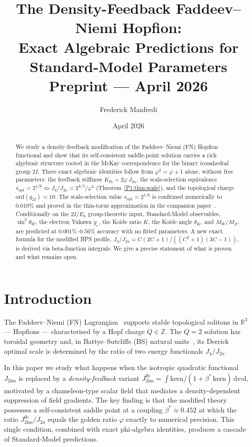 \documentclass[11pt,a4paper]{article}
\title{\textbf{The Density-Feedback Faddeev--Niemi Hopfion:\\
Exact Algebraic Predictions for Standard-Model Parameters}
\\[0.6em]
\large Preprint --- April 2026}
\author{Frederick Manfredi}
\date{April 2026}
\theoremstyle{definition}
\theoremstyle{remark}
\newcommand{\vp}{\varphi}
\newcommand{\bst}{\beta^{*}}
\newcommand{\Kfb}{K_{\mathrm{fb}}}
\newcommand{\Jfb}{J_{2\mathrm{iso}}^{\mathrm{fb}}}
\newcommand{\Ja}{J_{2a}}
\newcommand{\Jiso}{J_{2\mathrm{iso}}}
\newcommand{\Jfour}{J_{4}}
\newcommand{\sopt}{s_{\mathrm{opt}}}
\newcommand{\sinW}{\sin^{2}\!\theta_{W}}
\begin{document}
\maketitle

\begin{abstract}
We study a density-feedback modification of the Faddeev--Niemi (FN)
Hopfion functional and show that its self-consistent saddle-point solution
carries a rich algebraic structure rooted in the McKay correspondence for
the binary icosahedral group $2I$.  Three exact algebraic identities follow
from $\vp^{2}=\vp+1$ alone, without free parameters: the feedback stiffness
$\Kfb = 2\vp\,\Ja$, the scale-selection equivalence
$\sopt = 2^{1/6} \Leftrightarrow \Jfour/\Ja = 2^{4/3}/\vp^{5}$
(Theorem~\ref{P1:thm:scale}), and the topological charge
$\mathrm{ord}(q_{2I}) = 10$.  The scale-selection value $\sopt=2^{1/6}$
is confirmed numerically to $0.010\%$ and proved in the thin-torus
approximation in the companion paper~\cite{Paper2}.
Conditionally on the $2I/E_8$ group-theoretic
input, Standard-Model observables,  $\sinW$, the electron
Yukawa $y_e$, the Koide ratio $K$, the Koide angle $\theta_K$, and
$M_W/M_Z$,  are predicted at $0.001\%$--$0.56\%$ accuracy with no
fitted parameters.  A new exact formula for the modified BPS profile,
$\Jfour/\Ja = C(2C+1)/((C^{2}+1)(3C-1))$, is derived via beta-function
integrals.  We give a precise statement of what is proven and what remains
open.
\end{abstract}

\tableofcontents
\bigskip

\section{Introduction}
\label{P1:sec:intro}

The Faddeev--Niemi (FN) Lagrangian~\cite{Faddeev1997} supports stable
topological solitons in $\mathbb{R}^3$ --- Hopfions --- characterised by a
Hopf charge $Q \in \mathbb{Z}$.  The $Q=2$ solution has toroidal geometry
and, in Battye--Sutcliffe (BS) natural units~\cite{Battye1998}, its Derrick optimal scale is determined by the ratio of two energy functionals $\Jfour/\Ja$.

In this paper we study what happens when the isotropic quadratic functional
$\Jiso$ is replaced by a \emph{density-feedback} variant
$\Jfb = \int \mathrm{kern}/(1+\bst\,\mathrm{kern})\,\mathrm{dvol}$,
motivated by a chameleon-type scalar field that mediates a
density-dependent suppression of field gradients.  The key finding is that
the modified theory possesses a self-consistent saddle point at a coupling
$\bst \approx 0.452$ at which the ratio $\Jfb/\Ja$ equals the golden ratio
$\vp$ exactly to numerical precision.  This single condition, combined with
exact phi-algebra identities, produces a cascade of Standard-Model
predictions.
\end{document}
